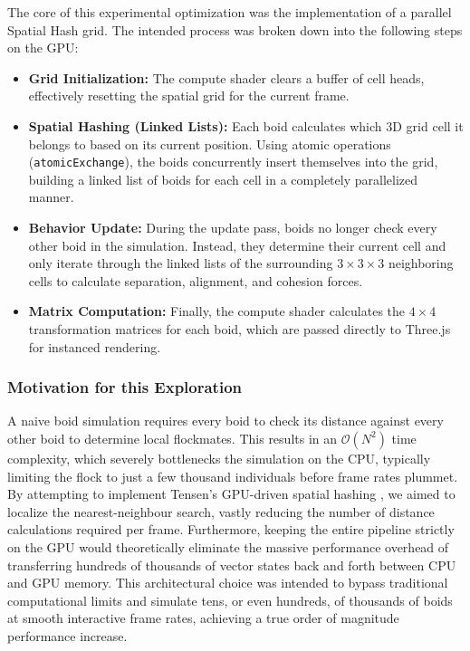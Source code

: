 \documentclass[a4paper, 12pt]{article}
\begin{document}
The core of this experimental optimization was the implementation of a parallel Spatial Hash grid. The intended process was broken down into the following steps on the GPU:
\begin{itemize}
    \item \textbf{Grid Initialization:} The compute shader clears a buffer of cell heads, effectively resetting the spatial grid for the current frame.
    \item \textbf{Spatial Hashing (Linked Lists):} Each boid calculates which 3D grid cell it belongs to based on its current position. Using atomic operations (\texttt{atomicExchange}), the boids concurrently insert themselves into the grid, building a linked list of boids for each cell in a completely parallelized manner.
    \item \textbf{Behavior Update:} During the update pass, boids no longer check every other boid in the simulation. Instead, they determine their current cell and only iterate through the linked lists of the surrounding $3 \times 3 \times 3$ neighboring cells to calculate separation, alignment, and cohesion forces.
    \item \textbf{Matrix Computation:} Finally, the compute shader calculates the $4 \times 4$ transformation matrices for each boid, which are passed directly to Three.js for instanced rendering.
\end{itemize}

\subsubsection*{Motivation for this Exploration}
A naive boid simulation requires every boid to check its distance against every other boid to determine local flockmates. This results in an $\mathcal{O}(N^2)$ time complexity, which severely bottlenecks the simulation on the CPU, typically limiting the flock to just a few thousand individuals before frame rates plummet.
\medbreak
By attempting to implement Tensen's GPU-driven spatial hashing \cite{order_of_magnitude_boids}, we aimed to localize the nearest-neighbour search, vastly reducing the number of distance calculations required per frame. Furthermore, keeping the entire pipeline strictly on the GPU would theoretically eliminate the massive performance overhead of transferring hundreds of thousands of vector states back and forth between CPU and GPU memory.
\medbreak
This architectural choice was intended to bypass traditional computational limits and simulate tens, or even hundreds, of thousands of boids at smooth interactive frame rates, achieving a true order of magnitude performance increase.
\end{document}

